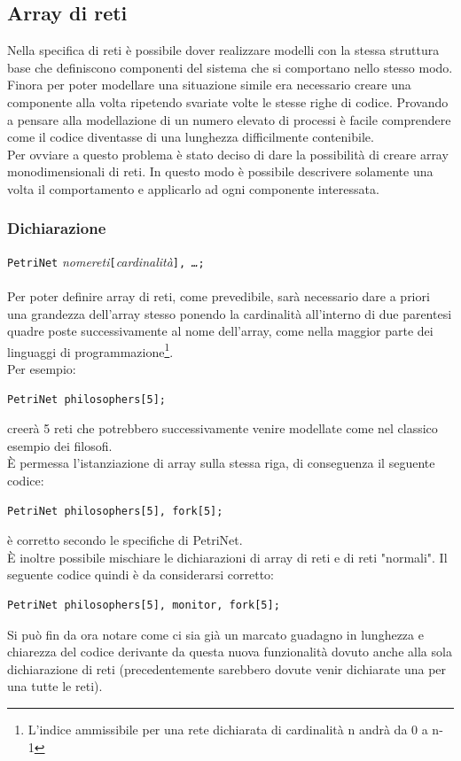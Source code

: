 \documentclass[italian,12pt]{book}
\begin{document}
\subsection{Array di reti}
Nella specifica di reti è possibile dover realizzare modelli con la stessa struttura base che 
definiscono componenti del sistema che si comportano nello stesso modo. Finora per poter modellare 
una situazione simile era necessario creare una componente alla volta ripetendo svariate volte 
le stesse righe di codice. Provando a pensare alla modellazione di un numero elevato di processi è 
facile comprendere come il codice diventasse di una lunghezza difficilmente contenibile. \\
Per ovviare a questo problema è stato deciso di dare la possibilità di creare array monodimensionali 
di reti. In questo modo è possibile descrivere solamente una volta il comportamento e applicarlo ad 
ogni componente interessata.

\subsubsection{Dichiarazione}
{\tt PetriNet} \emph{nomereti}{\tt[}\emph{cardinalità}{\tt], \emph{\dots};}\\
\\
Per poter definire array di reti, come prevedibile, sarà necessario dare a priori una grandezza 
dell'array stesso ponendo la cardinalità all'interno di due parentesi quadre poste successivamente al nome 
dell'array, come nella maggior parte dei linguaggi di programmazione\footnote{L'indice ammissibile per una 
rete dichiarata di cardinalità n andrà da 0 a n-1}.\\
Per esempio:
\begin{verbatim}PetriNet philosophers[5];
\end{verbatim}
creerà 5 reti che potrebbero successivamente venire modellate come nel classico esempio dei filosofi.\\
È permessa l'istanziazione di array sulla stessa riga, di conseguenza il seguente codice:
\begin{verbatim}PetriNet philosophers[5], fork[5];
\end{verbatim}
è corretto secondo le specifiche di PetriNet.\\
È inoltre possibile mischiare le dichiarazioni di array di reti e di reti "normali". Il seguente codice quindi
è da considerarsi corretto:
\begin{verbatim}PetriNet philosophers[5], monitor, fork[5];
\end{verbatim}
Si può fin da ora notare come ci sia già un marcato guadagno in lunghezza e chiarezza del codice derivante 
da questa nuova funzionalità dovuto anche alla sola dichiarazione di reti (precedentemente sarebbero dovute 
venir dichiarate una per una tutte le reti).
\end{document}
